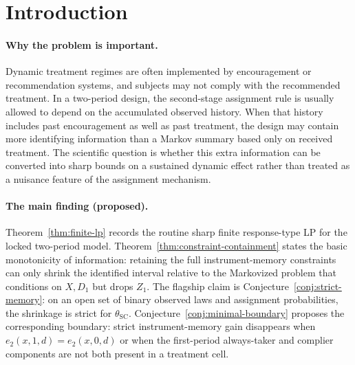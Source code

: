 \documentclass[11pt]{article}
\theoremstyle{definition}
\theoremstyle{plain}
\theoremstyle{remark}
\begin{document}
\section{Introduction}
\paragraph{Why the problem is important.}
Dynamic treatment regimes are often implemented by encouragement or recommendation systems, and subjects may not comply with the recommended treatment.  In a two-period design, the second-stage assignment rule is usually allowed to depend on the accumulated observed history.  When that history includes past encouragement as well as past treatment, the design may contain more identifying information than a Markov summary based only on received treatment.  The scientific question is whether this extra information can be converted into sharp bounds on a sustained dynamic effect rather than treated as a nuisance feature of the assignment mechanism.

\paragraph{The main finding (proposed).}
Theorem~\ref{thm:finite-lp} records the routine sharp finite response-type LP for the locked two-period model.  Theorem~\ref{thm:constraint-containment} states the basic monotonicity of information: retaining the full instrument-memory constraints can only shrink the identified interval relative to the Markovized problem that conditions on \(X,D_1\) but drops \(Z_1\).  The flagship claim is Conjecture~\ref{conj:strict-memory}: on an open set of binary observed laws and assignment probabilities, the shrinkage is strict for \(\theta_{\mathrm{SC}}\).  Conjecture~\ref{conj:minimal-boundary} proposes the corresponding boundary: strict instrument-memory gain disappears when \(e_2(x,1,d)=e_2(x,0,d)\) or when the first-period always-taker and complier components are not both present in a treatment cell.
\end{document}
